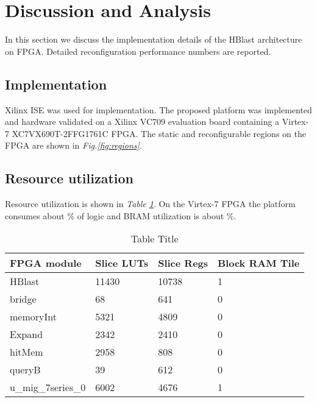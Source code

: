 \section{Discussion and Analysis}
\label{sec:discussion}

\quad In this section we discuss the implementation details of the HBlast architecture on FPGA. Detailed reconfiguration performance numbers are reported. 

\subsection{Implementation}
\quad Xilinx ISE was used for implementation. The proposed platform was implemented and hardware validated on a Xilinx VC709 evaluation board containing a Virtex-7 XC7VX690T-2FFG1761C FPGA. The static and reconfigurable regions on the FPGA are shown in \textit{Fig.\ref{fig:regions}}. 
\\
\subsection{Resource utilization}
Resource utilization is shown in \textit{Table \ref{tab:util}}. On the Virtex-7 FPGA the platform consumes about \% of logic and BRAM utilization is about \%.

\begin{table}[!t]
\caption {Table Title} \label{tab:util}
\begin{tabular}{l|l|l|l}
\hline
FPGA module        & Slice LUTs & Slice Regs & Block RAM Tile \\ \hline
HBlast             & 11430      & 10738      & 1              \\
bridge             & 68         & 641        & 0              \\
memoryInt          & 5321       & 4809       & 0              \\
Expand             & 2342       & 2410       & 0              \\
hitMem             & 2958       & 808        & 0              \\
queryB             & 39         & 612        & 0              \\
u\_mig\_7series\_0 & 6002       & 4676       & 1              \\ \hline

\end{tabular}
\end{table}


